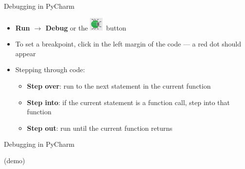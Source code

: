 \begin{frame}{Debugging in PyCharm}
	\begin{itemize}
		\pause\item \textbf{Run $\to$ Debug} or the \includegraphics[height=1.5ex]{pycharm_debug}\ button
		\pause\item To set a breakpoint, click in the left margin of the code --- a red dot should appear
		\pause\item Stepping through code:
			\begin{itemize}
				\pause\item \textbf{Step over}: run to the next statement in the current function
				\pause\item \textbf{Step into}: if the current statement is a function call, step into that function
				\pause\item \textbf{Step out}: run until the current function returns
			\end{itemize}
	\end{itemize}
\end{frame}

\begin{frame}{Debugging in PyCharm}
	\begin{center}
		(demo)
	\end{center}
\end{frame}
